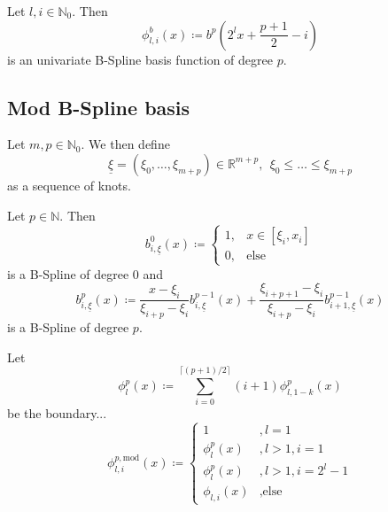 \documentclass[
  a4paper,  %
  twoside,  %
  bibliography=totoc,
  headsepline,
  cleardoublepage=empty,
  parskip=half,
  draft=false
]{scrbook}
\begin{document}
\begin{definition}
Let $l,i \in \mathds{N}_0$.
Then
\begin{equation}
\phi^b_{l,i}(x) \coloneqq b^p \left( 2^l x + \frac{p+1}{2} -i \right)
\end{equation}
is an univariate B-Spline basis function of degree $p$.
\end{definition}

\subsection{Mod B-Spline basis}

\begin{definition}[Knots]
Let $m,p \in \mathds{N}_0$.
We then define
\begin{equation}
\underline{\xi}=(\xi_0, \dots, \xi_{m + p}) \in \mathds{R}^{m + p}, ~~ \xi_0 \leq \dots \leq \xi_{m + p}
\end{equation}
as a sequence of knots.
\end{definition}

\begin{definition}[B-Splines]
Let $p \in \mathds{N}$.
Then
\begin{equation}
b^0_{i,\underline{\xi}}(x) \coloneqq
\begin{cases}
    1, & x \in [\xi_i,x_i] \\
   0, & \text{else}
\end{cases}
\end{equation}
is a B-Spline of degree $0$ and
\begin{equation}
b_{i,\underline{\xi}}^p(x) \coloneqq \frac{x - \xi_i}{\xi_{i + p} - \xi_i} b_{i,\underline{\xi}}^{p-1}(x) + \frac{\xi_{i+p+1} - \xi_i}{\xi_{i + p} - \xi_i} b_{i+1,\underline{\xi}}^{p-1}(x) 
\end{equation}
is a B-Spline of degree $p$.
\end{definition}

\begin{definition}
Let
\begin{equation}
\phi_l^p(x) \coloneqq \sum_{i=0}^{\lceil (p+1)/2 \rceil} (i+1) \phi^p_{l,1-k}(x)
\end{equation}
be the boundary...
\begin{equation}
\phi^{p,\text{mod}}_{l,i}(x) \coloneqq
\begin{cases}
1 &, l=1\\
\phi^p_{l}(x)&, l>1, i=1\\
\phi^p_{l}(x)&, l>1, i=2^l - 1\\
\phi_{l,i}(x)&, \text{else}
\end{cases}
\nonumber
\end{equation}
\end{definition}
\end{document}
